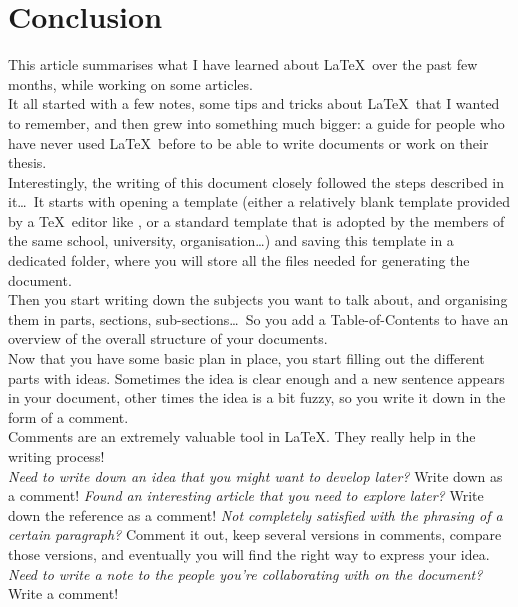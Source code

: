 

\section{Conclusion}

This article summarises what I have learned about \LaTeX\ over the past few months, while working on some articles. \\

It all started with a few notes, some tips and tricks about \LaTeX\ that I wanted to remember, and then grew into something much bigger: a guide for people who have never used \LaTeX\ before to be able to write documents or work on their thesis. \\

Interestingly, the writing of this document closely followed the steps described in it\dots\ It starts with opening a template (either a relatively blank template provided by a \TeX\ editor like \TeXstudio, or a standard template that is adopted by the members of the same school, university, organisation\dots) and saving this template in a dedicated folder, where you will store all the files needed for generating the document. \\

Then you start writing down the subjects you want to talk about, and organising them in parts, sections, sub-sections\dots\ So you add a Table-of-Contents to have an overview of the overall structure of your documents. \\

Now that you have some basic plan in place, you start filling out the different parts with ideas. Sometimes the idea is clear enough and a new sentence appears in your document, other times the idea is a bit fuzzy, so you write it down in the form of a comment. \\

Comments are an extremely valuable tool in \LaTeX. They really help in the writing process! \\

\emph{Need to write down an idea that you might want to develop later?} Write down as a comment! \emph{Found an interesting article that you need to explore later?} Write down the reference as a comment! \emph{Not completely satisfied with the phrasing of a certain paragraph?} Comment it out, keep several versions in comments, compare those versions, and eventually you will find the right way to express your idea. \emph{Need to write a note to the people you're collaborating with on the document?} Write a comment!

